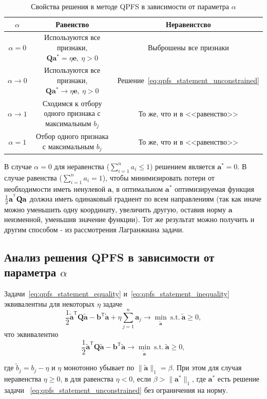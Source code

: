 \documentclass[12pt, twoside]{article}
\newcommand{\ba}{\mathbf{a}}
\newcommand{\be}{\mathbf{e}}
\newcommand{\bb}{\mathbf{b}}
\newcommand{\bQ}{\mathbf{Q}}
\newcommand{\getT}{^{\mathsf{T}}}
\begin{document}
\begin{table}[!htbp]
\caption{Свойства решения в методе QPFS в зависимости от параметра $\alpha$}
\label{tab:solution_properties}
\begin{tabular}{|c|c|c|}
\hline
$\alpha$ & Равенство & Неравенстсво\\
\hline
$\alpha=0$ & Используются все признаки, $\bQ \ba^* = \eta \be,\:\eta > 0$ & Выброшены все признаки \\
\hline
$\alpha \to 0$ &  Используются все признаки, $\bQ \ba^* \to \eta \be,\:\eta > 0$ & Решение~\eqref{eq:qpfs_statement_unconstrained} \\
\hline
$\alpha \to 1$ & Сходимся к отбору одного признака с максимальным $b_j$ & То же, что и в <<равенство>>\\
\hline
$\alpha = 1$ & Отбор одного признака с максимальным $b_j$ & То же, что и в <<равенство>>\\
\hline
\end{tabular}
\end{table}

В случае $\alpha=0$ для неравенства ($\sum\limits_{i=1}^n a_i \leq 1$) решением является $\ba^* = 0$. В случае равенства ($\sum\limits_{i=1}^n a_i = 1$), чтобы минимизировать потери от необходимости иметь ненулевой $\ba$, в оптимальном $\ba^*$ оптимизируемая функция $\frac{1}{2} \ba^{\T} \bQ \ba$ должна иметь одинаковый градиент по всем направлениям (так как иначе можно уменьшить одну координату, увеличить другую, оставив норму $\ba$ неизменной, уменьшив значение функции). Тот же результат можно получить и другим способом - из рассмотрения Лагранжиана задачи.

\subsection{Анализ решения QPFS в зависимости от параметра $\alpha$}

Задачи~\eqref{eq:qpfs_statement_equality} и~\eqref{eq:qpfs_statement_inequality} эквивалентны для некоторых $\eta$ задаче
$$
\frac{1}{2} \tilde{\ba}\getT \bQ \tilde{\ba} - \bb\getT \tilde{\ba} + \eta \sum\limits_{j = 1}^n \ba_j \to \min_{\tilde{\ba}}\:\text{s.t.}\: \tilde{\ba} \geq 0,
$$
что эквивалентно
$$
\frac{1}{2} \tilde{\ba}\getT \bQ \tilde{\ba} - \bb\getT \tilde{\ba} \to \min_{\tilde{\ba}}\:\text{s.t.}\: \tilde{\ba} \geq 0,$$

где $\tilde{b}_j = b_j - \eta$ и $\eta$ монотонно убывает по $\|\tilde{\ba}\|_1 = \beta$. При этом для случая неравенства $\eta \geq 0$, в для равенства $\eta < 0$, если $\beta > \|\ba^*\|_1$, где $\ba^*$ есть решение задачи ~\eqref{eq:qpfs_statement_unconstrained} без ограничения на норму.
\end{document}
